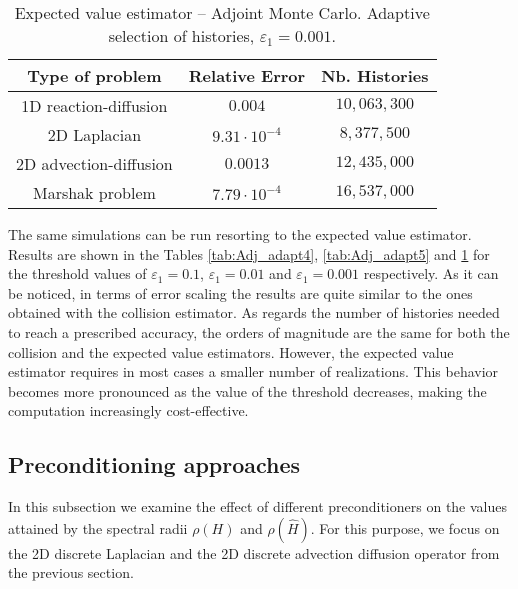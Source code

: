 \documentclass[final,leqno,onefignum,onetabnum]{siamltex1213}
\begin{document}
\begin{table}[!t]
\centering
\begin{tabular}{|c|c|c|}
\hline
\textbf{Type of problem} & \textbf{Relative Error} &\textbf{Nb. Histories}\\
\hline
1D reaction-diffusion & $0.004$ & $10,063,300$\\
\hline
2D Laplacian & $ 9.31 \cdot 10^{-4} $ & $ 8,377,500 $\\
\hline
2D advection-diffusion & $ 0.0013 $  & $ 12,435,000 $\\
\hline
Marshak problem & $7.79 \cdot 10^{-4}$ & $16,537,000$\\
\hline
\end{tabular}
\caption{Expected value estimator -- Adjoint Monte Carlo. Adaptive selection of histories,
$\varepsilon_1=0.001.$}
\label{tab:Adj_adapt6}
\end{table}

The same simulations can be run resorting to the expected value
estimator. Results are shown in the Tables \ref{tab:Adj_adapt4},
\ref{tab:Adj_adapt5} and \ref{tab:Adj_adapt6} for the threshold values of
$\varepsilon_1=0.1$, $\varepsilon_1=0.01$ and $\varepsilon_1=0.001$
respectively. As it can be noticed, in terms of error scaling the results are
quite similar to the ones obtained with the collision estimator. As regards
the number of histories needed to reach a prescribed accuracy, the
orders of magnitude are the same for both the collision and the
expected value estimators. However, the expected value estimator requires
in most cases a smaller number of realizations. This behavior becomes more
pronounced as the value of
the threshold decreases, making the computation increasingly cost-effective.

\subsection{Preconditioning approaches}

In this subsection we examine the effect of different preconditioners
on the values attained by the spectral radii $\rho(H)$ and $\rho(\hat{H})$.
For this purpose, we focus on the 2D discrete Laplacian and the
2D discrete advection
diffusion operator from the previous section.
\end{document}
